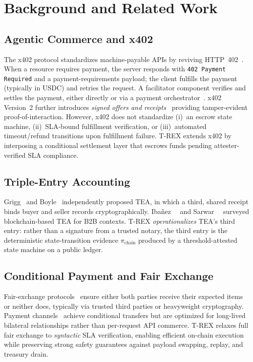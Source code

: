 \documentclass[journal]{IEEEtran}
\begin{document}
\section{Background and Related Work}
\label{sec:background}

\subsection{Agentic Commerce and x402}
The x402 protocol standardizes machine-payable APIs by reviving
HTTP~402~\cite{x402spec}.
When a resource requires payment, the server responds with
\texttt{402 Payment Required} and a payment-requirements payload;
the client fulfills the payment (typically in USDC) and retries the
request.
A facilitator component verifies and settles the payment, either
directly or via a payment orchestrator~\cite{x402facilitator}.
x402 Version~2 further introduces \emph{signed offers and
receipts}~\cite{x402receipts} providing tamper-evident
proof-of-interaction.
However, x402 does not standardize (i)~an escrow state machine,
(ii)~SLA-bound fulfillment verification, or (iii)~automated
timeout/refund transitions upon fulfillment failure.
T-REX extends x402 by interposing a conditional settlement layer
that escrows funds pending attester-verified SLA compliance.

\subsection{Triple-Entry Accounting}
Grigg~\cite{grigg2005} and Boyle~\cite{boyle2001} independently
proposed TEA, in which a third, shared receipt binds buyer and seller
records cryptographically.
Iba\~{n}ez~\etal~\cite{ibanez2023} and Sarwar~\etal~\cite{sarwar2023}
surveyed blockchain-based TEA for B2B contexts.
T-REX \emph{operationalizes} TEA's third entry: rather than a
signature from a trusted notary, the third entry is the deterministic
state-transition evidence $\pi_{\text{chain}}$ produced by a
threshold-attested state machine on a public ledger.

\subsection{Conditional Payment and Fair Exchange}
Fair-exchange protocols~\cite{asokan2004,pagnia2003} ensure either
both parties receive their expected items or neither does, typically
via trusted third parties or heavyweight cryptography.
Payment channels~\cite{poon2016lightning} achieve conditional
transfers but are optimized for long-lived bilateral relationships
rather than per-request API commerce.
T-REX relaxes full fair exchange to \emph{syntactic} SLA
verification, enabling efficient on-chain execution while preserving
strong safety guarantees against payload swapping, replay, and
treasury drain.
\end{document}
